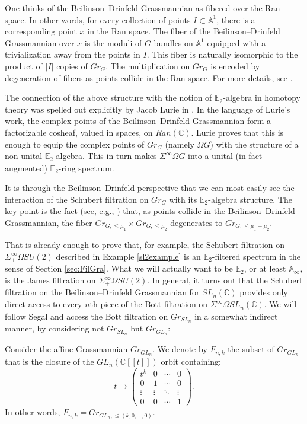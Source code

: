 One thinks of the Beilinson--Drinfeld Grassmannian as fibered over the Ran space.  In other words, for every collection of points $I \subset \mathbb{A}^1$, there is a corresponding point $x$ in the Ran space.  The fiber of the Beilinson--Drinfeld Grassmannian over $x$ is the moduli of $G$-bundles on $\mathbb{A}^1$ equipped with a trivialization away from the points in $I$.  This fiber is naturally isomorphic to the product of $|I|$ copies of $Gr_G$.  The multiplication on $Gr_G$ is encoded by degeneration of fibers as points collide in the Ran space.  For more details, see \cite[\S 3]{Zhu}.

The connection of the above structure with the notion of $\mathbb{E}_2$-algebra in homotopy theory was spelled out explicitly by Jacob Lurie in \cite[\S 5.5]{HA}.  In the language of Lurie's work, the complex points of the Beilinson--Drinfeld Grassmannian form a factorizable cosheaf, valued in spaces, on $Ran(\mathbb{C})$.  Lurie proves \cite[Theorem 5.5.4.10]{HA} that this is enough to equip the complex points of $Gr_G$ (namely $\Omega G$) with the structure of a non-unital $\mathbb{E}_2$ algebra.  This in turn makes $\Sigma^{\infty}_+ \Omega G$ into a unital (in fact augmented) $\mathbb{E}_2$-ring spectrum.

It is through the Beilinson--Drinfeld perspective that we can most easily see the interaction of the Schubert filtration on $Gr_G$ with its $\mathbb{E}_2$-algebra structure.  The key point is the fact (see, e.g., \cite[3.1.14]{Zhu}) that, as points collide in the Beilinson--Drinfeld Grassmannian, the fiber $Gr_{G,\le \mu_1} \times Gr_{G,\le \mu_2}$ degenerates to $Gr_{G, \le \mu_1+\mu_2}$.

That is already enough to prove that, for example, the Schubert filtration on $\Sigma^{\infty}_+ \Omega SU(2)$ described in Example \ref{sl2example} is an $\mathbb{E}_2$-filtered spectrum in the sense of Section \ref{sec:FilGra}.  What we will actually want to be $\mathbb{E}_2$, or at least $\mathbb{A}_\infty$, is the James filtration on $\Sigma^{\infty}_+ \Omega SU(2)$.  In general, it turns out that the Schubert filtration on the Beilinson--Drinfeld Grassmannian for $SL_n(\mathbb{C})$ provides only direct access to every $n$th piece of the Bott filtration on $\Sigma^{\infty}_+ \Omega SL_n(\mathbb{C})$.  We will follow Segal \cite{Segal} and access the Bott filtration on $Gr_{SL_n}$ in a somewhat indirect manner, by considering not $Gr_{SL_n}$ but $Gr_{GL_n}$:

\begin{dfn}
Consider the affine Grassmannian $Gr_{GL_n}$.  We denote by $F_{n,k}$ the subset of $Gr_{GL_n}$ that is the closure of the $GL_n(\mathbb{C}[[t]])$ orbit containing:
$$t \mapsto \left( \begin{array}{cccc} t^k & 0 & \cdots & 0 \\ 0 & 1 & \cdots & 0 \\ \vdots & \vdots & \ddots & \vdots \\ 0 & 0 & \cdots & 1 \end{array} \right).$$
In other words, $F_{n,k} = Gr_{GL_n, \le (k,0,\cdots,0)}$.
\end{dfn}

